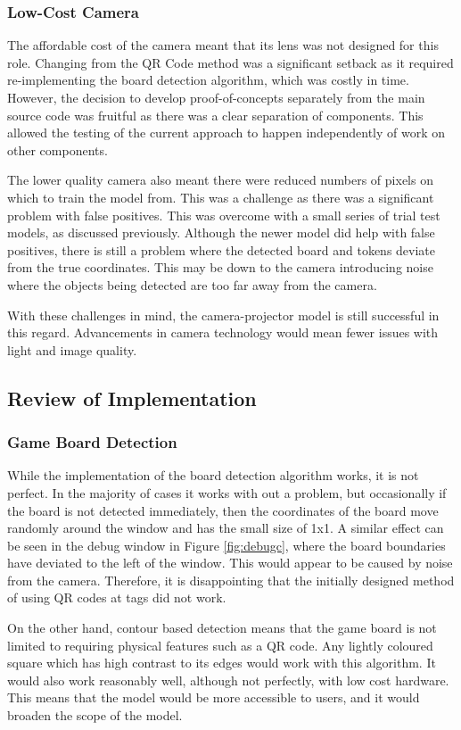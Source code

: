 \documentclass[12pt]{article}
\begin{document}
\subsubsection{Low-Cost Camera}
The affordable cost of the camera meant that its lens was not designed for this role. Changing from the QR Code method was a significant setback as it required re-implementing the board detection algorithm, which was costly in time. 
However, the decision to develop proof-of-concepts separately from the main source code was fruitful as there was a clear separation of components.
This allowed the testing of the current approach to happen independently of work on other components.

The lower quality camera also meant there were reduced numbers of pixels on which to train the model from. This was a challenge as there was a significant problem with false positives. 
This was overcome with a small series of trial test models, as discussed previously. 
Although the newer model did help with false positives, there is still a problem where the detected board and tokens deviate from the true coordinates. This may be down to the camera introducing noise where the objects being detected are too far away from the camera. 

With these challenges in mind, the camera-projector model is still successful in this regard. Advancements in camera technology would mean fewer issues with light and image quality. 

\subsection{Review of Implementation}
\subsubsection{Game Board Detection}
While the implementation of the board detection algorithm works, it is not perfect. 
In the majority of cases it works with out a problem, but occasionally if the board is not detected immediately, then the coordinates of the board move randomly around the window and has the small size of 1x1. 
A similar effect can be seen in the debug window in Figure \ref{fig:debugc}, where the board boundaries have deviated to the left of the window. 
This would appear to be caused by noise from the camera. 
Therefore, it is disappointing that the initially designed method of using QR codes at tags did not work.

On the other hand, contour based detection means that the game board is not limited to requiring physical features such as a QR code. 
Any lightly coloured square which has high contrast to its edges would work with this algorithm.
It would also work reasonably well, although not perfectly, with low cost hardware. 
This means that the model would be more accessible to users, and it would broaden the scope of the model.
\end{document}
